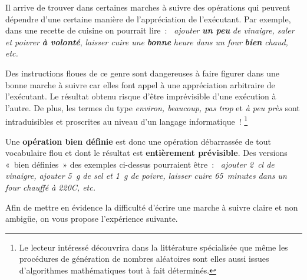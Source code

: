 			Il arrive de trouver dans certaines marches à suivre 
			des opérations qui peuvent dépendre d’une certaine manière 
			de l’appréciation de l’exécutant. 
			Par exemple, dans une recette de cuisine on pourrait lire~:~
			\textit{ajouter} \textbf{\textit{un peu}} 
			\textit{de vinaigre, saler et poivrer} 
			\textbf{\textit{à volonté}}, \textit{laisser cuire une} 
			\textbf{\textit{bonne}}
			\textit{ heure dans un four}
			\textbf{\textit{bien}} \textit{chaud, etc.}
			
			Des instructions floues de ce genre 
			sont dangereuses à faire figurer dans une bonne marche à suivre 
			car elles font appel à une appréciation arbitraire de l’exécutant. 
			Le résultat obtenu risque d’être imprévisible 
			d’une exécution à l’autre. 
			De plus, les termes du type \textit{environ, beaucoup, pas trop} 
			et \textit{à peu près} sont intraduisibles 
			et proscrites au niveau d’un langage informatique~!%
			\footnote{%
				Le lecteur intéressé découvrira 
				dans la littérature spécialisée 
				que même les procédures de génération de nombres aléatoires
				sont elles aussi issues d’algorithmes mathématiques 
				tout à fait déterminés.
			}
			
			Une \textbf{opération bien définie} 
			est donc une opération débarrassée
			de tout vocabulaire flou 
			et dont le résultat est \textbf{entièrement prévisible}. 
			Des versions «~bien définies~» des exemples ci-dessus
			pourraient être~:~
			\textit{ajouter 2~cl de vinaigre, ajouter 5~g de sel
			et 1~g de poivre, 
			laisser cuire 65~minutes dans un four chauffé à 220\degre{}C, etc.}
	
			Afin de mettre en évidence la difficulté d’écrire une
			marche à suivre claire et non ambigüe, on vous propose
			l’expérience suivante.
	
